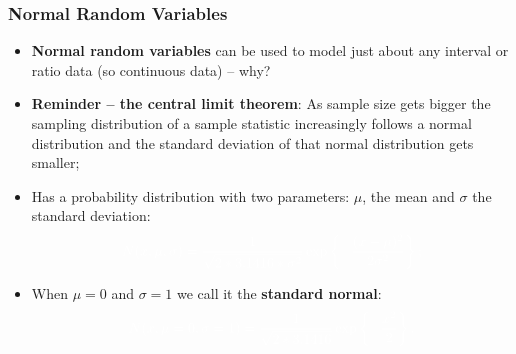 \documentclass[aspectratio=169]{beamer}
\theoremstyle{principle}
\begin{document}
\begin{frame}
\frametitle{Normal Random Variables}

\begin{itemize}
\item \textbf{Normal random variables} can be used to model just about any interval or ratio data (so continuous data) -- why?
\bigskip

\item \textbf{Reminder -- the central limit theorem}: As sample size gets bigger the sampling distribution of a sample statistic increasingly follows a normal distribution and the standard deviation of that normal distribution gets smaller;
\bigskip

\item[]\color{white} Has a probability distribution with two parameters: $\mu$, the mean and $\sigma$ the standard deviation:
\begin{align*}
\color{white}N(x,\mu,\sigma) = \frac{1}{\sqrt{2*3.1416*\sigma^2}}\exp\left\{-\frac{(x - \mu)^2}{2\sigma^2}\right\};
\end{align*}

\item[]\color{white} When $\mu = 0$ and $\sigma = 1$ we call it the \textbf{standard normal}:
\begin{align*}
\color{white}N(x,\mu=0,\sigma=1) = \frac{1}{\sqrt{2*3.1416}}\exp\left\{-\frac{x^2}{2}\right\}.
\end{align*}

\end{itemize}

\end{frame}
\end{document}

